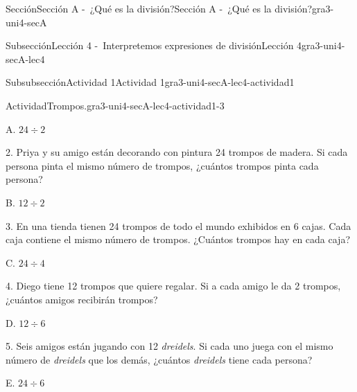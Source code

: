 \documentclass[twoside,10pt,]{article}
\begin{document}
\begin{sectionptx}{Sección}{Sección A -~¿Qué es la división?}{}{Sección A -~¿Qué es la división?}{}{}{gra3-uni4-secA}
\begin{subsectionptx}{Subsección}{Lección 4 -~Interpretemos expresiones de división}{}{Lección 4}{}{}{gra3-uni4-secA-lec4}
\begin{subsubsectionptx}{Subsubsección}{Actividad 1}{}{Actividad 1}{}{}{gra3-uni4-secA-lec4-actividad1}
\begin{activity}{Actividad}{Trompos.}{gra3-uni4-secA-lec4-actividad1-3}
\begin{sidebyside}{2}{0.05}{0}{0.15}
\begin{sbspanel}{0.6}
\end{sbspanel}%
\begin{sbspanel}{0.2}%
\par
A. \(24 \div 2\)%
\end{sbspanel}%
\end{sidebyside}%
\begin{sidebyside}{2}{0.05}{0}{0.15}%
\begin{sbspanel}{0.6}%
2. Priya y su amigo están decorando con pintura 24 trompos de madera. Si cada persona pinta el mismo número de trompos, ¿cuántos trompos pinta cada persona?%
\end{sbspanel}%
\begin{sbspanel}{0.2}%
\par
B. \(12 \div 2\)%
\end{sbspanel}%
\end{sidebyside}%
\begin{sidebyside}{2}{0.05}{0}{0.15}%
\begin{sbspanel}{0.6}%
3. En una tienda tienen 24 trompos de todo el mundo exhibidos en 6 cajas. Cada caja contiene el mismo número de trompos. ¿Cuántos trompos hay en cada caja?%
\end{sbspanel}%
\begin{sbspanel}{0.2}%
\par
C. \(24 \div 4\)%
\end{sbspanel}%
\end{sidebyside}%
\begin{sidebyside}{2}{0.05}{0}{0.15}%
\begin{sbspanel}{0.6}%
4. Diego tiene 12 trompos que quiere regalar. Si a cada amigo le da 2 trompos, ¿cuántos amigos recibirán trompos?%
\end{sbspanel}%
\begin{sbspanel}{0.2}%
\par
D. \(12 \div 6\)%
\end{sbspanel}%
\end{sidebyside}%
\begin{sidebyside}{2}{0.05}{0}{0.15}%
\begin{sbspanel}{0.6}%
5. Seis amigos están jugando con 12 \emph{dreidels}. Si cada uno juega con el mismo número de \emph{dreidels} que los demás, ¿cuántos \emph{dreidels} tiene cada persona?%
\end{sbspanel}%
\begin{sbspanel}{0.2}%
\par
E. \(24 \div 6\)%
\end{sbspanel}%
\end{sidebyside}%

\end{activity}
\end{subsubsectionptx}
\end{subsectionptx}
\end{sectionptx}
\end{document}
